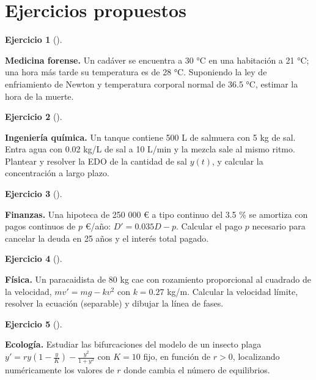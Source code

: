 \documentclass[
  spanish,
  a4paper,
]{scrreport}
\theoremstyle{definition}
\newtheorem{exercise}{Ejercicio}[chapter]
\theoremstyle{remark}
\begin{document}
\section{Ejercicios propuestos}\label{ejercicios-propuestos}

\begin{exercise}[]\protect\hypertarget{exr-propuesto-forense}{}\label{exr-propuesto-forense}

\textbf{Medicina forense.} Un cadáver se encuentra a 30 °C en una
habitación a 21 °C; una hora más tarde su temperatura es de 28 °C.
Suponiendo la ley de enfriamiento de Newton y temperatura corporal
normal de 36.5 °C, estimar la hora de la muerte.

\end{exercise}

\begin{exercise}[]\protect\hypertarget{exr-propuesto-mezclas}{}\label{exr-propuesto-mezclas}

\textbf{Ingeniería química.} Un tanque contiene 500 L de salmuera con 5
kg de sal. Entra agua con 0.02 kg/L de sal a 10 L/min y la mezcla sale
al mismo ritmo. Plantear y resolver la EDO de la cantidad de sal
\(y(t)\), y calcular la concentración a largo plazo.

\end{exercise}

\begin{exercise}[]\protect\hypertarget{exr-propuesto-hipoteca}{}\label{exr-propuesto-hipoteca}

\textbf{Finanzas.} Una hipoteca de 250 000 € a tipo continuo del 3.5 \%
se amortiza con pagos continuos de \(p\) €/año: \(D' = 0.035D - p\).
Calcular el pago \(p\) necesario para cancelar la deuda en 25 años y el
interés total pagado.

\end{exercise}

\begin{exercise}[]\protect\hypertarget{exr-propuesto-paracaidista}{}\label{exr-propuesto-paracaidista}

\textbf{Física.} Un paracaidista de 80 kg cae con rozamiento
proporcional al cuadrado de la velocidad, \(mv' = mg - kv^2\) con
\(k=0.27\) kg/m. Calcular la velocidad límite, resolver la ecuación
(separable) y dibujar la línea de fases.

\end{exercise}

\begin{exercise}[]\protect\hypertarget{exr-propuesto-bifurcacion}{}\label{exr-propuesto-bifurcacion}

\textbf{Ecología.} Estudiar las bifurcaciones del modelo de un insecto
plaga \(y' = ry\left(1-\frac{y}{K}\right) - \frac{y^2}{1+y^2}\) con
\(K=10\) fijo, en función de \(r>0\), localizando numéricamente los
valores de \(r\) donde cambia el número de equilibrios.

\end{exercise}
\end{document}
